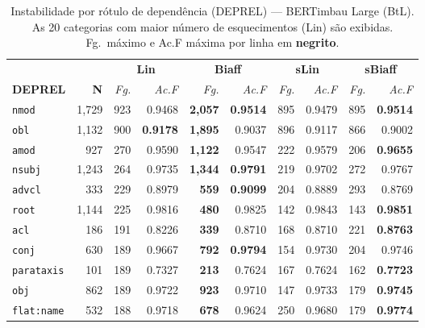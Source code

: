 \clearpage
\begin{table}[p]
\centering
\caption{Instabilidade por r\'otulo de depend\^encia (DEPREL) --- BERTimbau Large (BtL).
As 20 categorias com maior n\'umero de esquecimentos (Lin) s\~ao exibidas.
Fg.\ m\'aximo e Ac.F m\'axima por linha em \textbf{negrito}.}
\label{tab:instab-btl-deprel}
\begingroup
\scriptsize\setlength{\tabcolsep}{2pt}\renewcommand{\arraystretch}{1.25}%
\begin{tabular}{l r| r r| r r| r r| r r}
\toprule
\multicolumn{2}{c|}{}
  & \multicolumn{2}{c|}{\textbf{Lin}}
  & \multicolumn{2}{c|}{\textbf{Biaff}}
  & \multicolumn{2}{c|}{\textbf{sLin}}
  & \multicolumn{2}{c}{\textbf{sBiaff}} \\
\textbf{DEPREL} & \textbf{N}
  & \textit{Fg.} & \textit{Ac.F}
  & \textit{Fg.} & \textit{Ac.F}
  & \textit{Fg.} & \textit{Ac.F}
  & \textit{Fg.} & \textit{Ac.F} \\
\cmidrule(lr){3-4}\cmidrule(lr){5-6}\cmidrule(lr){7-8}\cmidrule(lr){9-10}
  \texttt{nmod} & 1,729 & 923 & 0.9468 & \textbf{2,057} & \textbf{0.9514} & 895 & 0.9479 & 895 & \textbf{0.9514} \\
  \texttt{obl} & 1,132 & 900 & \textbf{0.9178} & \textbf{1,895} & 0.9037 & 896 & 0.9117 & 866 & 0.9002 \\
  \texttt{amod} & 927 & 270 & 0.9590 & \textbf{1,122} & 0.9547 & 222 & 0.9579 & 206 & \textbf{0.9655} \\
  \texttt{nsubj} & 1,243 & 264 & 0.9735 & \textbf{1,344} & \textbf{0.9791} & 219 & 0.9702 & 272 & 0.9767 \\
  \texttt{advcl} & 333 & 229 & 0.8979 & \textbf{559} & \textbf{0.9099} & 204 & 0.8889 & 293 & 0.8769 \\
  \texttt{root} & 1,144 & 225 & 0.9816 & \textbf{480} & 0.9825 & 142 & 0.9843 & 143 & \textbf{0.9851} \\
  \texttt{acl} & 186 & 191 & 0.8226 & \textbf{339} & 0.8710 & 168 & 0.8710 & 221 & \textbf{0.8763} \\
  \texttt{conj} & 630 & 189 & 0.9667 & \textbf{792} & \textbf{0.9794} & 154 & 0.9730 & 204 & 0.9746 \\
  \texttt{parataxis} & 101 & 189 & 0.7327 & \textbf{213} & 0.7624 & 167 & 0.7624 & 162 & \textbf{0.7723} \\
  \texttt{obj} & 862 & 189 & 0.9722 & \textbf{923} & 0.9710 & 147 & 0.9733 & 179 & \textbf{0.9745} \\
  \texttt{flat\!:\!name} & 532 & 188 & 0.9718 & \textbf{678} & 0.9624 & 250 & 0.9680 & 179 & \textbf{0.9774} \\

\end{tabular}
\end{table}

